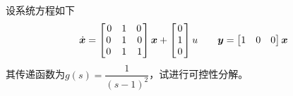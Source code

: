 \examples 设系统方程如下
\begin{equation*}
	\dot{\bm{x}} = 
	\begin{bmatrix}
		\hspace*{0.5mm}0& 1 & 0\hspace*{0.5mm} \\
		0 & 1 & 0\\
		0 & 1 & 1
	\end{bmatrix}
	\bm{x}
	+
	\begin{bmatrix}
		\hspace*{0.5mm}0\hspace*{0.5mm}\\
		1\\
		0
	\end{bmatrix}
	u
	\qquad
	\bm{y} = 
	\begin{bmatrix}
		1 & 0 & 0
	\end{bmatrix}
	\bm{x}
\end{equation*}
其传递函数为$g(s) = \dfrac{1}{(s-1)^2}$，试进行可控性分解。

